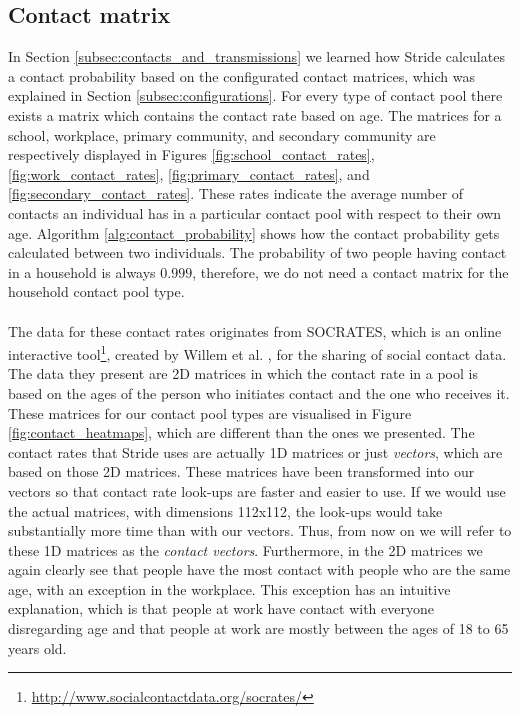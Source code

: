 \subsection{Contact matrix}
\label{subsec:contact_matrix}
In Section \ref{subsec:contacts_and_transmissions} we learned how Stride calculates a contact probability based on the configurated contact matrices, which was explained in Section \ref{subsec:configurations}. For every type of contact pool there exists a matrix which contains the contact rate based on age. The matrices for a school, workplace, primary community, and secondary community are respectively displayed in Figures \ref{fig:school_contact_rates}, \ref{fig:work_contact_rates}, \ref{fig:primary_contact_rates}, and \ref{fig:secondary_contact_rates}. These rates indicate the average number of contacts an individual has in a particular contact pool with respect to their own age. Algorithm \ref{alg:contact_probability} shows how the contact probability gets calculated between two individuals. The probability of two people having contact in a household is always $0.999$, therefore, we do not need a contact matrix for the household contact pool type.
\\\\
The data for these contact rates originates from SOCRATES, which is an online interactive tool\footnote{\url{http://www.socialcontactdata.org/socrates/}}, created by Willem et al. \cite{socrates}, for the sharing of social contact data. The data they present are 2D matrices in which the contact rate in a pool is based on the ages of the person who initiates contact and the one who receives it. These matrices for our contact pool types are visualised in Figure \ref{fig:contact_heatmaps}, which are different than the ones we presented. The contact rates that Stride uses are actually 1D matrices or just \textit{vectors}, which are based on those 2D matrices. These matrices have been transformed into our vectors so that contact rate look-ups are faster and easier to use. If we would use the actual matrices, with dimensions 112x112, the look-ups would take substantially more time than with our vectors. Thus, from now on we will refer to these 1D matrices as the \textit{contact vectors}. Furthermore, in the 2D matrices we again clearly see that people have the most contact with people who are the same age, with an exception in the workplace. This exception has an intuitive explanation, which is that people at work have contact with everyone disregarding age and that people at work are mostly between the ages of 18 to 65 years old. 

